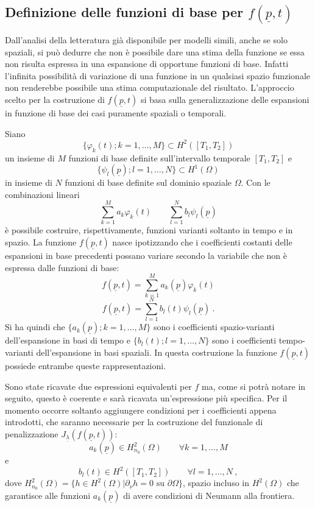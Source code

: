 \documentclass[a4paper,11pt,twoside,openright]{book}							%
\begin{document}
\subsection{Definizione delle funzioni di base per $f(\underline p,t)$}
\label{subs:basi}

Dall'analisi della letteratura già disponibile per modelli simili, anche se solo spaziali, si può dedurre che non è possibile dare una stima della funzione se essa non risulta espressa in una espansione di opportune funzioni di base. Infatti l'infinita possibilità di variazione di una funzione in un qualsiasi spazio funzionale non renderebbe possibile una stima computazionale del risultato. L'approccio scelto per la costruzione di $f(\underline p,t)$ si basa sulla generalizzazione delle espansioni in funzione di base dei casi puramente spaziali o temporali.

Siano 
$$
\{ \varphi_k(t);k=1, \ldots , M \} \subset H^2([T_1,T_2])
$$
un insieme di $M$ funzioni di base definite sull'intervallo temporale $[T_1,T_2]$ e
$$
\{ \psi_l(\underline p);l=1, \ldots , N \} \subset H^1(\Omega)
$$
in insieme di $N$ funzioni di base definite sul dominio spaziale $\Omega$. Con le combinazioni lineari
$$
\sum_{k=1}^M a_k\varphi_k(t) \qquad \sum_{l=1}^N b_l\psi_l(\underline p)
$$
è possibile costruire, rispettivamente, funzioni varianti soltanto in tempo e in spazio. La funzione $f(\underline p,t)$ nasce ipotizzando che i coefficienti costanti delle espansioni in base precedenti possano variare secondo la variabile che non è espressa dalle funzioni di base:
\begin{equation} 
\label{eq:f_temp}
f(\underline p, t) = \sum_{k=1}^M a_k(\underline p)\varphi_k(t)
\end{equation}
\begin{equation}
\label{eq:f_space}
f(\underline p, t) = \sum_{l=1}^N b_l(t)\psi_l(\underline p) \ .
\end{equation}
Si ha quindi che $\{ a_k(\underline p);k=1, \ldots , M \}$ sono i coefficienti spazio-varianti dell'espansione in basi di tempo e $\{ b_l(t);l=1, \ldots , N \}$ sono i coefficienti tempo-varianti dell'espansione in basi spaziali. In questa costruzione la funzione $f(\underline p,t)$ possiede entrambe queste rappresentazioni.

Sono state ricavate due espressioni equivalenti per $f$ ma, come si potrà notare in seguito, questo è coerente e sarà ricavata un'espressione più specifica. Per il momento occorre soltanto aggiungere condizioni per i coefficienti appena introdotti, che saranno necessarie per la costruzione del funzionale di penalizzazione $J_{\underline \lambda }(f(\underline p,t))$:
$$
a_k(\underline p) \in H_{n_0}^2(\Omega) \qquad \forall k=1, \ldots , M
$$
e
$$
b_l(t) \in H^2([T_1,T_2]) \qquad \forall l=1, \ldots , N \ ,
$$
dove $H^2_{n_0}(\Omega) = \{h \in H^2(\Omega) | \partial _{\nu}h=0 \mbox{ su } \partial \Omega\}$, spazio incluso in $H^2(\Omega)$ che garantisce alle funzioni $a_k(\underline p)$ di avere condizioni di Neumann alla frontiera.
\end{document}
